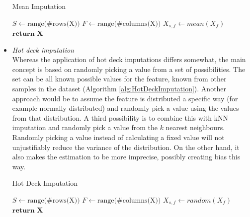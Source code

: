 \documentclass[10pt,a4paper]{report}
\begin{document}
\begin{itemize}
		\begin{algorithm}[H]
			\caption{Mean Imputation}\label{alg:MeanImputation}
			\begin{algorithmic}[1]
				\State $S \gets \text{range(\#rows(X))}$ 	
				\State $F \gets \text{range(\#columns(X))}$ 	
				 					
				 				 			
				\State $X_{s,f} \gets \textit{mean}(X_f)$	
				\EndIf
				\EndFor
				\State $\textbf{return X}$
				\EndProcedure
			\end{algorithmic}
		\end{algorithm}	
		
		\item \textit{Hot deck imputation} \\
		Whereas the application of hot deck imputations differs somewhat\cite{myrtveit2001analyzing, cartwright2003dealing, haukoos2007advanced}, the main concept is based on randomly picking a value from a set of possibilities. The set can be all known possible values for the feature, known from other samples in the dataset (Algorithm \ref{alg:HotDeckImputation}). Another approach would be to assume the feature is distributed a specific way (for example normally distributed) and randomly pick a value using the values from that distribution. A third possibility is to combine this with kNN imputation and randomly pick a value from the $k$ nearest neighbours. Randomly picking a value instead of calculating a fixed value will not unjustifiably reduce the variance of the distribution. On the other hand, it also makes the estimation to be more imprecise, possibly creating bias this way\cite{haukoos2007advanced}.
		
		\begin{algorithm}[H]
			\caption{Hot Deck Imputation}\label{alg:HotDeckImputation}
			\begin{algorithmic}[1]
				\State $S \gets \text{range(\#rows(X))}$ 	
				\State $F \gets \text{range(\#columns(X))}$ 	
				 					
				 				 			
				\State $X_{s,f} \gets \textit{random}(X_f)$	
				\EndIf
				\EndFor
				\State $\textbf{return X}$
				\EndProcedure
			\end{algorithmic}
		\end{algorithm}	
		

\end{itemize}
\end{document}
